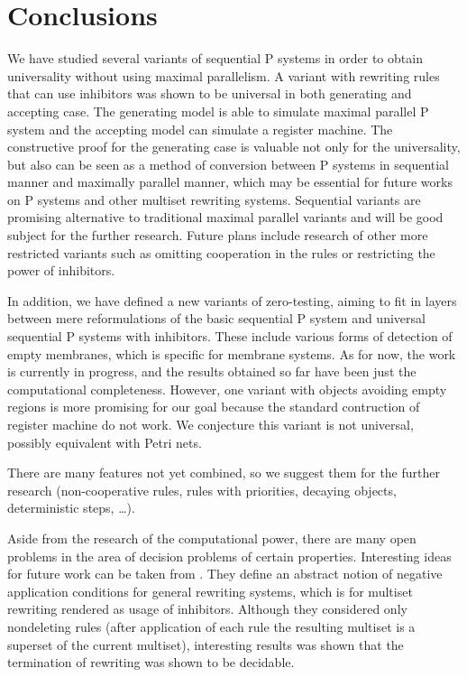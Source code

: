 \chapter*{Conclusions}
We have studied several variants of sequential P systems in order to obtain universality without using maximal parallelism. A variant with rewriting rules that can use inhibitors was shown to be universal in both generating and accepting case. The generating model is able to simulate maximal parallel P system and the accepting model can simulate a register machine.
The constructive proof for the generating case is valuable not only for the universality, but also can be seen as a method of conversion between P systems in sequential manner and maximally parallel manner, which may be essential for future works on P systems and other multiset rewriting systems. Sequential variants are promising alternative to traditional maximal parallel variants and will be good subject for the further research. Future plans include research of other more restricted variants such as omitting cooperation in the rules or restricting the power of inhibitors.

In addition, we have defined a new variants of zero-testing, aiming to fit in layers between mere reformulations of the basic sequential P system and universal sequential P systems with inhibitors. These include various forms of detection of empty membranes, which is specific for membrane systems. As for now, the work is currently in progress, and the results obtained so far have been just the computational completeness. However, one variant with objects avoiding empty regions is more promising for our goal because the standard contruction of register machine do not work. We conjecture this variant is not universal, possibly equivalent with Petri nets.

There are many features not yet combined, so we suggest them for the further research (non-cooperative rules, rules with priorities, decaying objects, deterministic steps, \ldots).

Aside from the research of the computational power, there are many open problems in the area of decision problems of certain properties. Interesting ideas for future work can be taken from \cite{Bottoni06Inhibitors}. They define an abstract notion of negative application conditions for general rewriting systems, which is for multiset rewriting rendered as usage of inhibitors. Although they considered only nondeleting rules (after application of each rule the resulting multiset is a superset of the current multiset), interesting results was shown that the termination of rewriting was shown to be decidable.

